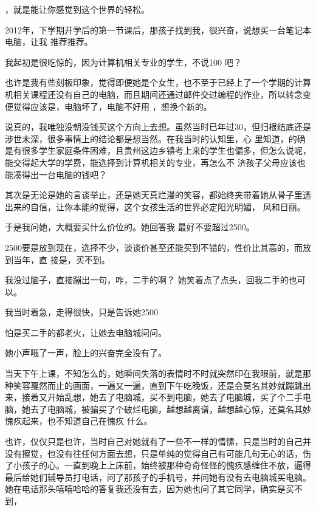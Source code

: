 \documentclass{article}
\begin{document}
，就是能让你感觉到这个世界的轻松。 

2012年，下学期开学后的第一节课后，那孩子找到我，很兴奋，说想买一台笔记本电脑，让我
推荐推荐。 

我起初是很吃惊的，因为计算机相关专业的学生，不说100%
吧？ 

也许是我有些刻板印象，觉得即便她是个女生，也不至于已经上了一个学期的计算机相关课程还没有自己的电脑，而且期间还通过邮件交过编程的作业，所以转念变便觉得应该是，电脑坏了，电脑不好用
，想换个新的。 

说真的，我唯独没朝没钱买这个方向上去想。虽然当时已年过30，但归根结底还是涉世未深，很多事情上的结论都是想当然。在我当时的认知里，心
\newpage
里知道，的确是有很多学生家庭条件困难，且贵州这边乡镇考上来的学生也偏多，但怎么说呢，能交得起大学的学费，能选择到计算机相关的专业，再怎么不
济孩子父母应该也能凑得出一台电脑的钱吧？ 

其次是无论是她的言谈举止，还是她天真烂漫的笑容，都始终夹带着她从骨子里透出来的自信，让你本能的觉得，这个女孩生活的世界必定阳光明媚，
风和日丽。 

于是我问她，大概要买什么价位的。她回答我
最好不要超过2500。 

2500要是放到现在，选择不少，谈谈价甚至还能买到不错的，性价比其高的，而放到当年，直
接是，买不到。 

我没过脑子，直接蹦出一句，咋，二手的啊？
她笑着点了点头，回我二手的也可以。 

我当时着急，走得很快，只是告诉她2500
\newpage

怕是买二手的都老火，让她去电脑城问问。 


她小声哦了一声，脸上的兴奋完全没有了。 

当天下午上课，不知怎么的，她瞬间失落的表情时不时就突然印在我眼前，就是那种笑容戛然而止的画面，一遍又一遍，直到下午吃晚饭，还是会莫名其妙就蹦跳出来，接着又开始乱想，她去了电脑城，买不到电脑，她去了电脑城，买了个二手电脑，她去了电脑城，被骗买了个破烂电脑，越想越离谱，越想越心惊，还莫名其妙愧疚起来，也不知道自己在愧疚
什么。 

也许，仅仅只是也许，当时自己对她就有了一些不一样的情愫，只是当时的自己并没有擦觉，也没有往任何方面去想，只是单纯的觉得自己有可能几句无心的话，伤了小孩子的心。一直到晚上上床前，始终被那种奇奇怪怪的愧疚感缠住不放，逼得最后给她们辅导员打电话，问了那孩子的手机号，并问她有没有去电脑城买电脑。她在电话那头嘻嘻哈哈的答复我还没有去，因为她也问了其它同学，确实是买不到，
\newpage
\end{document}
